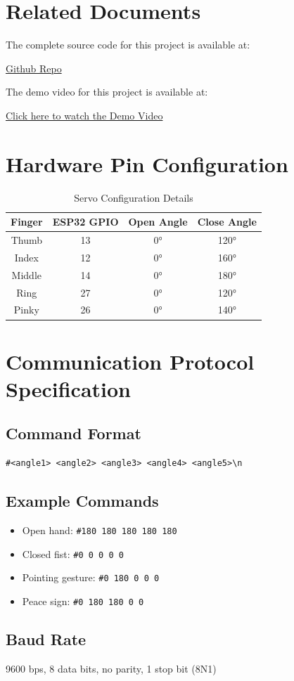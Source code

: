 \documentclass[12pt]{article}
\begin{document}
\section{Related Documents}

The complete source code for this project is available at:
\begin{center}
    \href{https://github.com/hunganh1310/IT3931-Project-II}{Github Repo}
\end{center}

The demo video for this project is available at:
\begin{center}
    \href{https://drive.google.com/file/d/1ATmGgyqYcDjSp1uDy9gH0fnHCdQS-FYf/view?usp=sharing}{Click here to watch the Demo Video}
\end{center}

\section{Hardware Pin Configuration}

\begin{table}[H]
\centering
\begin{tabular}{cccc}
\toprule
\textbf{Finger} & \textbf{ESP32 GPIO} & \textbf{Open Angle} & \textbf{Close Angle} \\
\midrule
Thumb & 13 & 0° & 120° \\
Index & 12 & 0° & 160° \\
Middle & 14 & 0° & 180° \\
Ring & 27 & 0° & 120° \\
Pinky & 26 & 0° & 140° \\
\bottomrule
\end{tabular}
\caption{Servo Configuration Details}
\end{table}

\section{Communication Protocol Specification}

\subsection{Command Format}
\begin{verbatim}
#<angle1> <angle2> <angle3> <angle4> <angle5>\n
\end{verbatim}

\subsection{Example Commands}
\begin{itemize}
    \item Open hand: \texttt{\#180 180 180 180 180}
    \item Closed fist: \texttt{\#0 0 0 0 0}
    \item Pointing gesture: \texttt{\#0 180 0 0 0}
    \item Peace sign: \texttt{\#0 180 180 0 0}
\end{itemize}

\subsection{Baud Rate}
9600 bps, 8 data bits, no parity, 1 stop bit (8N1)
\end{document}
